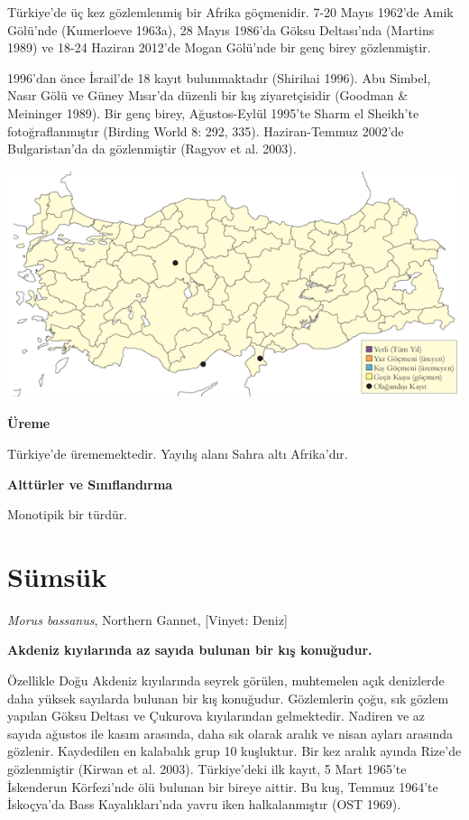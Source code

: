 \documentclass[
  letterpaper,
  DIV=11,
  numbers=noendperiod]{scrreprt}
\begin{document}
Türkiye'de üç kez gözlemlenmiş bir Afrika göçmenidir. 7-20 Mayıs 1962'de
Amik Gölü'nde (Kumerloeve 1963a), 28 Mayıs 1986'da Göksu Deltası'nda
(Martins 1989) ve 18-24 Haziran 2012'de Mogan Gölü'nde bir genç birey
gözlenmiştir.

1996'dan önce İsrail'de 18 kayıt bulunmaktadır (Shirihai 1996). Abu
Simbel, Nasır Gölü ve Güney Mısır'da düzenli bir kış ziyaretçisidir
(Goodman \& Meininger 1989). Bir genç birey, Ağustos-Eylül 1995'te Sharm
el Sheikh'te fotoğraflanmıştır (Birding World 8: 292, 335).
Haziran-Temmuz 2002'de Bulgaristan'da da gözlenmiştir (Ragyov et al.
2003).

\includegraphics{images/harita_Page_058.png}

\textbf{Üreme}

Türkiye'de ürememektedir. Yayılış alanı Sahra altı Afrika'dır.

\textbf{Alttürler ve Sınıflandırma}

Monotipik bir türdür.

\section{Sümsük}\label{suxfcmsuxfck}

\emph{Morus bassanus}, Northern Gannet, {[}Vinyet: Deniz{]}

\textbf{Akdeniz kıyılarında az sayıda bulunan bir kış konuğudur.}

Özellikle Doğu Akdeniz kıyılarında seyrek görülen, muhtemelen açık
denizlerde daha yüksek sayılarda bulunan bir kış konuğudur. Gözlemlerin
çoğu, sık gözlem yapılan Göksu Deltası ve Çukurova kıyılarından
gelmektedir. Nadiren ve az sayıda ağustos ile kasım arasında, daha sık
olarak aralık ve nisan ayları arasında gözlenir. Kaydedilen en kalabalık
grup 10 kuşluktur. Bir kez aralık ayında Rize'de gözlenmiştir (Kirwan et
al. 2003). Türkiye'deki ilk kayıt, 5 Mart 1965'te İskenderun Körfezi'nde
ölü bulunan bir bireye aittir. Bu kuş, Temmuz 1964'te İskoçya'da Bass
Kayalıkları'nda yavru iken halkalanmıştır (OST 1969).
\end{document}
